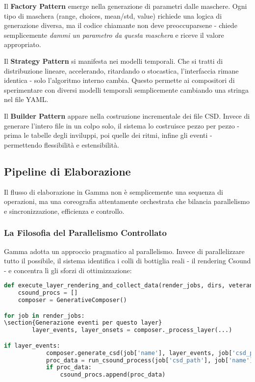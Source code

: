 Il \textbf{Factory Pattern} emerge nella generazione di parametri dalle maschere. Ogni tipo di maschera (range, choices, mean/std, value) richiede una logica di generazione diversa, ma il codice chiamante non deve preoccuparsene - chiede semplicemente \textit{dammi un parametro da questa maschera} e riceve il valore appropriato.

Il \textbf{Strategy Pattern} si manifesta nei modelli temporali. Che si tratti di distribuzione lineare, accelerando, ritardando o stocastica, l'interfaccia rimane identica - solo l'algoritmo interno cambia. Questo permette ai compositori di sperimentare con diversi modelli temporali semplicemente cambiando una stringa nel file YAML.

Il \textbf{Builder Pattern} appare nella costruzione incrementale dei file CSD. Invece di generare l'intero file in un colpo solo, il sistema lo costruisce pezzo per pezzo - prima le tabelle degli inviluppi, poi quelle dei ritmi, infine gli eventi - permettendo flessibilità e estensibilità.
\subsection{Pipeline di Elaborazione}
Il flusso di elaborazione in Gamma non è semplicemente una sequenza di operazioni, ma una coreografia attentamente orchestrata che bilancia parallelismo e sincronizzazione, efficienza e controllo.
\subsubsection{La Filosofia del Parallelismo Controllato}
Gamma adotta un approccio pragmatico al parallelismo. Invece di parallelizzare tutto il possibile, il sistema identifica i colli di bottiglia reali - il rendering Csound - e concentra lì gli sforzi di ottimizzazione:

\begin{lstlisting}[language=Python]
def execute_layer_rendering_and_collect_data(render_jobs, dirs, veteran_mode_active):
    csound_procs = []
    composer = GenerativeComposer()

for job in render_jobs:
\section{Generazione eventi per questo layer}
        layer_events, layer_onsets = composer._process_layer(...)

if layer_events:
            composer.generate_csd(job['name'], layer_events, job['csd_path'], job['wav_path'])
            proc_data = run_csound_process(job['csd_path'], job['name'], dirs['logs'])
            if proc_data: 
                csound_procs.append(proc_data)
\end{lstlisting}

